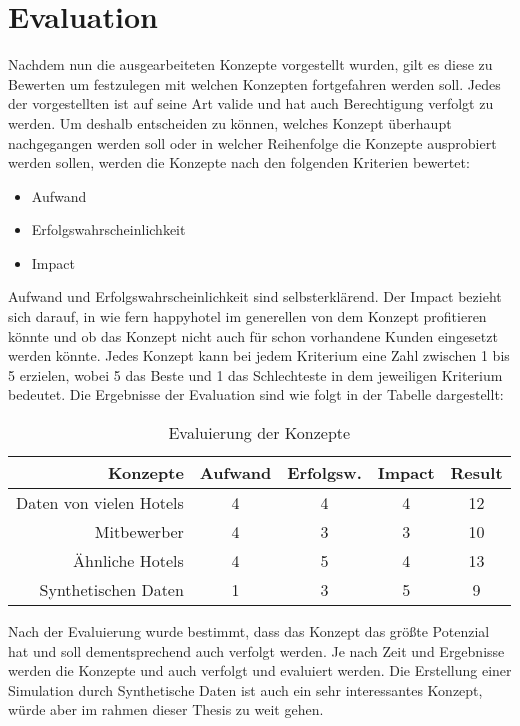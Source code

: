 \section{Evaluation}
\label{sec:eval_konzept}
Nachdem nun die ausgearbeiteten Konzepte vorgestellt wurden, gilt es diese zu Bewerten um festzulegen mit welchen Konzepten fortgefahren werden soll. Jedes der vorgestellten ist auf seine Art valide und hat auch Berechtigung verfolgt zu werden. Um deshalb entscheiden zu können, welches Konzept überhaupt nachgegangen werden soll oder in welcher Reihenfolge die Konzepte ausprobiert werden sollen, werden die Konzepte nach den folgenden Kriterien bewertet:
\begin{itemize}
    \item Aufwand
    \item Erfolgswahrscheinlichkeit
    \item Impact
\end{itemize}
Aufwand und Erfolgswahrscheinlichkeit sind selbsterklärend. Der Impact bezieht sich darauf, in wie fern happyhotel im generellen von dem Konzept profitieren könnte und ob das Konzept nicht auch für schon vorhandene Kunden eingesetzt werden könnte.
\newline
\newline
Jedes Konzept kann bei jedem Kriterium eine Zahl zwischen 1 bis 5 erzielen, wobei 5 das Beste und 1 das Schlechteste in dem jeweiligen Kriterium bedeutet. Die Ergebnisse der Evaluation sind wie folgt in der Tabelle dargestellt:
\begin{table}[ht]
    \centering
    \begin{tabularx}{\textwidth}{|d|c|c|c|c|}
        \textbf{Konzepte} & \textbf{Aufwand} & \textbf{Erfolgsw.} & \textbf{Impact} & \textbf{Result} \\
        \hline
        Daten von vielen Hotels & 4       & 4            & 4      & 12 
        \\
        Mitbewerber             & 4       & 3            & 3      & 10                \\
        Ähnliche Hotels         & 4       & 5            & 4      & 13  
        \\
        Synthetischen Daten     & 1       & 3            & 5      & 9   \\
    \end{tabularx}
    \caption[Evaluierung der Konzepte]{Evaluierung der Konzepte}
    \label{table:eval_kozepts}
\end{table}

Nach der Evaluierung wurde bestimmt, dass das Konzept \emph{} das größte Potenzial hat und soll dementsprechend auch verfolgt werden. Je nach Zeit und Ergebnisse werden die Konzepte \emph{} und \emph{} auch verfolgt und evaluiert werden. Die Erstellung einer Simulation durch Synthetische Daten ist auch ein sehr interessantes Konzept, würde aber im rahmen dieser Thesis zu weit gehen.